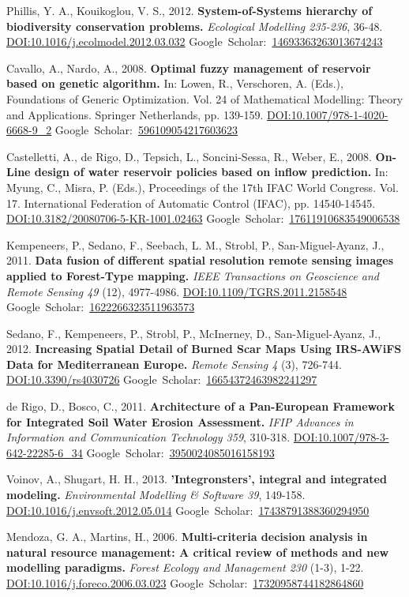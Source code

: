 \documentclass[a4paper,11pt]{article}
\newcommand{\goDOI}[1]{\href{http://dx.doi.org/#1}{DOI:#1}}
\newcommand{\goScholar}[1]{{Google~Scholar}:~\href{http://scholar.google.com/scholar?cluster=#1}{#1}}
\begin{document}
\begin{footnotesize}
{\begin{thebibliography}{}
 Phillis, Y. A., Kouikoglou, V. S., 2012. \textbf{System-of-Systems hierarchy of biodiversity conservation problems.} \emph{Ecological Modelling 235-236}, 36-48.  \goDOI{10.1016/j.ecolmodel.2012.03.032} \goScholar{14693363263013674243}

 Cavallo, A., Nardo, A., 2008. \textbf{Optimal fuzzy management of reservoir based on genetic algorithm.} In: Lowen, R., Verschoren, A. (Eds.), Foundations of Generic Optimization. Vol. 24 of Mathematical Modelling: Theory and Applications. Springer Netherlands, pp. 139-159. \goDOI{10.1007/978-1-4020-6668-9\_2} \goScholar{596109054217603623}

 Castelletti, A., de Rigo, D., Tepsich, L., Soncini-Sessa, R., Weber, E., 2008. \textbf{On-Line design of water reservoir policies based on inflow prediction.} In: Myung, C., Misra, P. (Eds.), Proceedings of the 17th IFAC World Congress. Vol. 17. International Federation of Automatic Control (IFAC), pp. 14540-14545. \goDOI{10.3182/20080706-5-KR-1001.02463} \goScholar{17611910683549006538}

 Kempeneers, P., Sedano, F., Seebach, L. M., Strobl, P., San-Miguel-Ayanz, J., 2011. \textbf{Data fusion of different spatial resolution remote sensing images applied to Forest-Type mapping.} \emph{IEEE Transactions on Geoscience and Remote Sensing 49} (12), 4977-4986. \goDOI{10.1109/TGRS.2011.2158548} \goScholar{1622266323511963573}

 Sedano, F., Kempeneers, P., Strobl, P., McInerney, D., San-Miguel-Ayanz, J., 2012. \textbf{Increasing Spatial Detail of Burned Scar Maps Using IRS-AWiFS Data for Mediterranean Europe.} \emph{Remote Sensing 4} (3), 726-744. \goDOI{10.3390/rs4030726} \goScholar{16654372463982241297}

 de Rigo, D., Bosco, C., 2011. \textbf{Architecture of a Pan-European Framework for Integrated Soil Water Erosion Assessment.} \emph{IFIP Advances in Information and Communication Technology 359}, 310-318. \goDOI{10.1007/978-3-642-22285-6\_34} \goScholar{3950024085016158193}

 Voinov, A., Shugart, H. H., 2013. \textbf{'Integronsters', integral and integrated modeling.} \emph{Environmental Modelling \& Software 39}, 149-158. \goDOI{10.1016/j.envsoft.2012.05.014} \goScholar{17438791388360294950}

 Mendoza, G. A., Martins, H., 2006. \textbf{Multi-criteria decision analysis in natural resource management: A critical review of methods and new modelling paradigms.} \emph{Forest Ecology and Management 230} (1-3), 1-22. \goDOI{10.1016/j.foreco.2006.03.023} \goScholar{17320958744182864860}


\end{thebibliography}}
\end{footnotesize}
\end{document}
